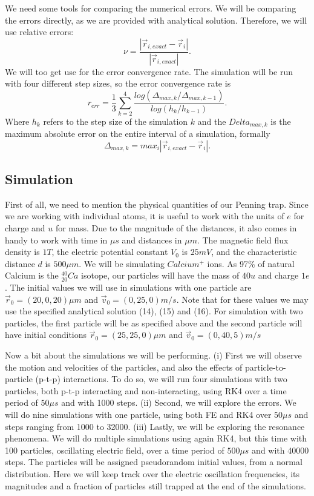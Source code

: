 \documentclass[english,notitlepage,reprint,nofootinbib]{revtex4-1}
\begin{document}
We need some tools for comparing the numerical errors. We will be comparing the errors directly, as we are provided with analytical solution. Therefore, we will use relative errors:
\begin{equation}
    \nu = \frac{|\vec{r}_{i,exact} - \vec{r}_i|}{|\vec{r}_{i,exact}|}.
\end{equation}
We will too get use for the error convergence rate. The simulation will be run with four different step sizes, so the error convergence rate is
\begin{equation}
    r_{err} = \frac{1}{3} \sum_{k=2}^4 \frac{log(\Delta_{max,k}/\Delta_{max,k-1})}{log(h_k/h_{k-1})}.
\end{equation}
Where $h_k$ refers to the step size of the simulation $k$ and the $Delta_{max,k}$ is the maximum absolute error on the entire interval of a simulation, formally
$$ \Delta _{max,k} = max_i |\vec{r}_{i,exact} - \vec{r}_i| . $$

\subsection*{Simulation}
First of all, we need to mention the physical quantities of our Penning trap. Since we are working with individual atoms, it is useful to work with the units of $e$ for charge and $u$ for mass. Due to the magnitude of the distances, it also comes in handy to work with time in $\mu s$ and distances in $\mu m$. The magnetic field flux density is $1T$, the electric potential constant $V_0$ is $25mV$, and the characteristic distance $d$ is $500 \mu m$.
We will be simulating $Calcium^+$ ions. As 97\% of natural Calcium is the $^{40} _{20} Ca$ isotope, our particles will have the mass of $40u$ and charge $1e$. The initial values we will use in simulations with one particle are $\vec{r}_0 = (20,0,20)\mu m$ and $\vec{v}_0 = (0,25,0)m/s$. Note that for these values we may use the specified analytical solution (14), (15) and (16).
For simulation with two particles, the first particle will be as specified above and the second particle will have initial conditions $\vec{r}_0 = (25,25,0)\mu m$ and $\vec{v}_0 = (0,40,5)m/s$

Now a bit about the simulations we will be performing. (i) First we will observe 
the motion and velocities of the particles, and also the effects of particle-to-particle (p-t-p) interactions. To do so, we will run four simulations with two particles, both p-t-p interacting and non-interacting, using RK4 over a time period of $50 \mu s$ and with 1000 steps. 
(ii) Second, we will explore the errors. We will do nine simulations with one particle, using both FE and RK4 over $50 \mu s$ and steps ranging from 1000 to 32000. 
(iii) Lastly, we will be exploring the resonance phenomena. We will do multiple simulations using again RK4, but this time with 100 particles, oscillating electric field, over a time period of $500 \mu s$ and with 40000 steps. The particles will be assigned pseudorandom initial values, from a normal distribution. Here we will keep track over the electric oscillation frequencies, its magnitudes and a fraction of particles still trapped at the end of the simulations.
\end{document}
